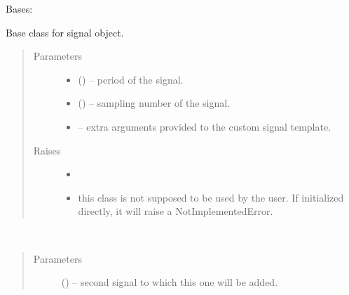 \documentclass[letterpaper,10pt,english]{sphinxmanual}
\begin{document}

\begin{fulllineitems}
\label{\detokenize{triflow.plugins:triflow.plugins.signals.Signal}}
Bases: 

Base class for signal object.
\begin{quote}\begin{description}
\item[{Parameters}] \leavevmode\begin{itemize}
\item {} 
 () -- period of the signal.

\item {} 
 (\sphinxstyleliteralemphasis{, }) -- sampling number of the signal.

\item {} 
 -- extra arguments provided to the custom signal template.

\end{itemize}

\item[{Raises}] \leavevmode\begin{itemize}
\item {} 

\item {} 
this class is not supposed to be used by the user. If initialized directly, it will raise a NotImplementedError.

\end{itemize}

\end{description}\end{quote}

\begin{fulllineitems}
\label{\detokenize{triflow.plugins:triflow.plugins.signals.Signal.__add__}}~\begin{quote}\begin{description}
\item[{Parameters}] \leavevmode
{} () -- second signal to which this one will be added.


\end{description}
\end{quote}
\end{fulllineitems}
\end{fulllineitems}
\end{document}
